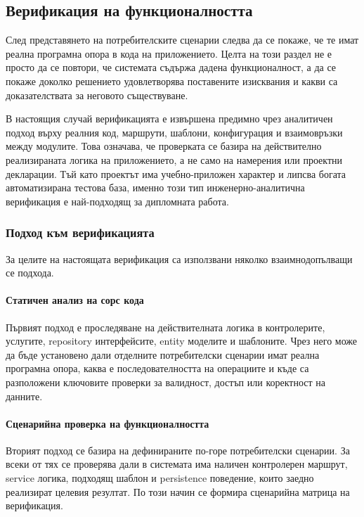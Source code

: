 \subsection{Верификация на функционалността}

След представянето на потребителските сценарии следва да се покаже, че те имат реална програмна опора в кода на приложението. Целта на този раздел не е просто да се повтори, че системата съдържа дадена функционалност, а да се покаже доколко решението удовлетворява поставените изисквания и какви са доказателствата за неговото съществуване.

В настоящия случай верификацията е извършена предимно чрез аналитичен подход върху реалния код, маршрути, шаблони, конфигурация и взаимовръзки между модулите. Това означава, че проверката се базира на действително реализираната логика на приложението, а не само на намерения или проектни декларации. Тъй като проектът има учебно-приложен характер и липсва богата автоматизирана тестова база, именно този тип инженерно-аналитична верификация е най-подходящ за дипломната работа.

\subsubsection{Подход към верификацията}

За целите на настоящата верификация са използвани няколко взаимнодопълващи се подхода.

\paragraph{Статичен анализ на сорс кода}

Първият подход е проследяване на действителната логика в контролерите, услугите, repository интерфейсите, entity моделите и шаблоните. Чрез него може да бъде установено дали отделните потребителски сценарии имат реална програмна опора, каква е последователността на операциите и къде са разположени ключовите проверки за валидност, достъп или коректност на данните.

\paragraph{Сценарийна проверка на функционалността}

Вторият подход се базира на дефинираните по-горе потребителски сценарии. За всеки от тях се проверява дали в системата има наличен контролерен маршрут, service логика, подходящ шаблон и persistence поведение, които заедно реализират целевия резултат. По този начин се формира сценарийна матрица на верификация.

